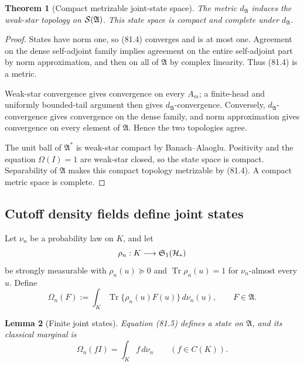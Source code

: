 \documentclass[11pt]{article}
\newtheorem{theorem}{Theorem}[section]
\newtheorem{lemma}[theorem]{Lemma}
\theoremstyle{remark}
\begin{document}
\begin{theorem}[Compact metrizable joint-state space]
\label{thm:v12v81-state-space}
The metric \(d_{\mathfrak A}\) induces the weak-star topology on
\({\cal S}({\mathfrak A})\).  This state space is compact and
complete under \(d_{\mathfrak A}\).
\end{theorem}

\begin{proof}
States have norm one, so (81.4) converges and is at most one.
Agreement on the dense self-adjoint family implies agreement on the
entire self-adjoint part by norm approximation, and then on all of
\({\mathfrak A}\) by complex linearity.  Thus (81.4) is a metric.

Weak-star convergence gives convergence on every \(A_m\); a
finite-head and uniformly bounded-tail argument then gives
\(d_{\mathfrak A}\)-convergence.  Conversely,
\(d_{\mathfrak A}\)-convergence gives convergence on the dense
family, and norm approximation gives convergence on every element of
\({\mathfrak A}\).  Hence the two topologies agree.

The unit ball of \({\mathfrak A}^*\) is weak-star compact by
Banach--Alaoglu.  Positivity and the equation \(\Omega(I)=1\) are
weak-star closed, so the state space is compact.  Separability of
\({\mathfrak A}\) makes this compact topology metrizable by (81.4).
A compact metric space is complete.
\end{proof}

\subsection{Cutoff density fields define joint states}

Let \(\nu_n\) be a probability law on \(K\), and let
\[
 \rho_n:K\longrightarrow{\mathfrak S}_1({\cal H}_*)
\]
be strongly measurable with
\(\rho_n(u)\succeq0\) and \(\operatorname{Tr}\rho_n(u)=1\)
for \(\nu_n\)-almost every \(u\).  Define
\begin{equation}
 \Omega_n(F)
 :=
 \int_K\operatorname{Tr}\{\rho_n(u)F(u)\}\,d\nu_n(u),
 \qquad F\in{\mathfrak A}.                                  \tag{81.5}
\end{equation}

\begin{lemma}[Finite joint states]
\label{lem:v12v81-finite-state}
Equation (81.5) defines a state on \({\mathfrak A}\), and its
classical marginal is
\begin{equation}
                         \Omega_n(fI)=\int_Kf\,d\nu_n
                         \qquad(f\in C(K)).                  \tag{81.6}
\end{equation}
\end{lemma}
\end{document}
